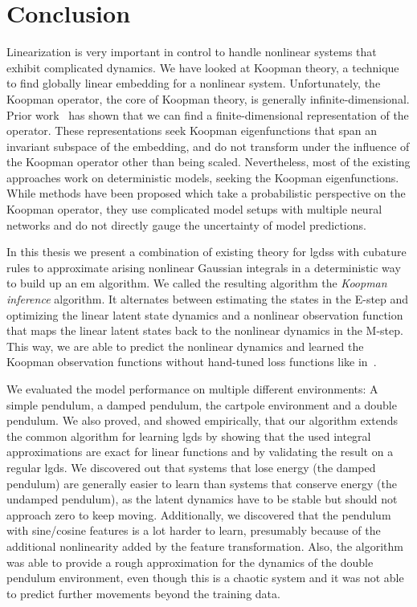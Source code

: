 \chapter{Conclusion}
\label{c:conclusion}



Linearization is very important in control to handle nonlinear systems that exhibit complicated dynamics. We have looked at Koopman theory, a technique to find globally linear embedding for a nonlinear system. Unfortunately, the Koopman operator, the core of Koopman theory, is generally infinite-dimensional. Prior work~\cite{bruntonKoopmanInvariantSubspaces2016,kaiserDatadrivenDiscoveryKoopman2020,luschDeepLearningUniversal2018} has shown that we can find a finite-dimensional representation of the operator. These representations seek Koopman eigenfunctions that span an invariant subspace of the embedding, and do not transform under the influence of the Koopman operator other than being scaled. Nevertheless, most of the existing approaches work on deterministic models, seeking the Koopman eigenfunctions. While methods have been proposed which take a probabilistic perspective on the Koopman operator, they use complicated model setups with multiple neural networks and do not directly gauge the uncertainty of model predictions.

In this thesis we present a combination of existing theory for \aclp{lgds} with cubature rules to approximate arising nonlinear Gaussian integrals in a deterministic way to build up an \acl{em} algorithm. We called the resulting algorithm the \emph{Koopman inference} algorithm. It alternates between estimating the states in the E-step and optimizing the linear latent state dynamics and a nonlinear observation function that maps the linear latent states back to the nonlinear dynamics in the M-step. This way, we are able to predict the nonlinear dynamics and learned the Koopman observation functions without hand-tuned loss functions like in~\cite{luschDeepLearningUniversal2018}.

We evaluated the model performance on multiple different environments: A simple pendulum, a damped pendulum, the cartpole environment and a double pendulum. We also proved, and showed empirically, that our algorithm extends the common algorithm for learning \ac{lgds} by showing that the used  integral approximations are exact for linear functions and by validating the result on a regular \ac{lgds}. We discovered out that systems that lose energy (\eg the damped pendulum) are generally easier to learn than systems that conserve energy (\eg the undamped pendulum), as the latent dynamics have to be stable but should not approach zero to keep moving. Additionally, we discovered that the pendulum with sine/cosine features is a lot harder to learn, presumably because of the additional nonlinearity added by the feature transformation. Also, the algorithm was able to provide a rough approximation for the dynamics of the double pendulum environment, even though this is a chaotic system and it was not able to predict further movements beyond the training data.

